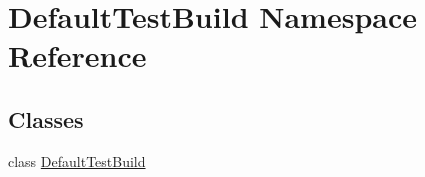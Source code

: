 \hypertarget{namespaceDefaultTestBuild}{\section{Default\-Test\-Build Namespace Reference}
\label{namespaceDefaultTestBuild}
}
\subsection*{Classes}
\begin{DoxyCompactItemize}
\item 
class \hyperlink{classDefaultTestBuild_1_1DefaultTestBuild}{Default\-Test\-Build}
\end{DoxyCompactItemize}
